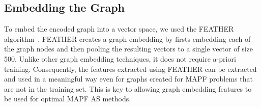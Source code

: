 \documentclass{ecai}
\newcommand{\Carmel}[1]{}
\newcommand{\Roni}[1]{}
\begin{document}










\subsection{Embedding the Graph}

To embed the encoded graph into a vector space, we used the FEATHER algorithm~\cite{rozemberczki2020characteristic}. 
FEATHER creates a graph embedding by firsts embedding each of the graph nodes and then pooling the resulting vectors to a single vector of size 500. 
Unlike other graph embedding techniques, it does not require a-priori training. 
Consequently, the features extracted using FEATHER can be extracted and used in a meaningful way even for graphs created for MAPF problems that are not in the training set. 
This is key to allowing graph embedding features to be used for optimal MAPF AS methods. 
\end{document}
